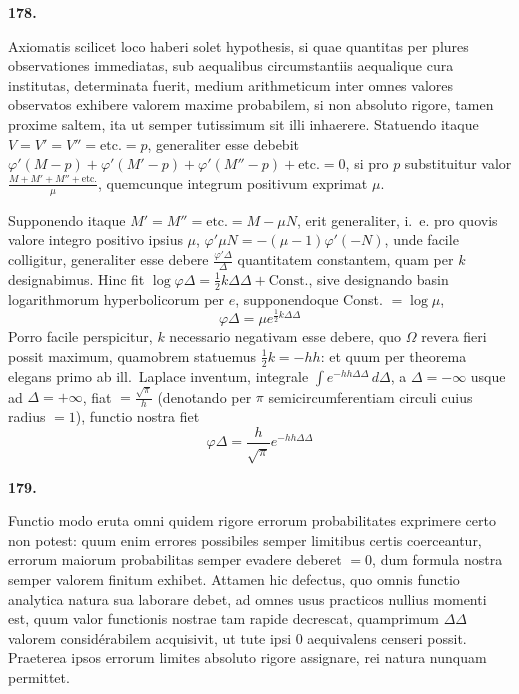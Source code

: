 \documentclass[11pt,a4paper]{article}
\begin{document}
\newpage
\setcounter{page}{252}

\noindent\textbf{178.}

Axiomatis scilicet loco haberi solet hypothesis, si quae quantitas per plures observationes immediatas, sub aequalibus circumstantiis aequalique cura institutas, determinata fuerit, medium arithmeticum inter omnes valores observatos exhibere valorem maxime probabilem, si non absoluto rigore, tamen proxime saltem, ita ut semper tutissimum sit illi inhaerere. Statuendo itaque $V = V' = V'' = \text{etc.} = p$, generaliter esse debebit $\varphi'(M-p) + \varphi'(M'-p) + \varphi'(M''-p) + \text{etc.} = 0$, si pro $p$ substituitur valor $\frac{M + M' + M'' + \text{etc.}}{\mu}$, quemcunque integrum positivum exprimat $\mu$.

Supponendo itaque $M' = M'' = \text{etc.} = M - \mu N$, erit generaliter, i.~e. pro quovis valore integro positivo ipsius $\mu$, $\varphi'\mu N = -(\mu-1)\varphi'(-N)$, unde facile colligitur, generaliter esse debere $\frac{\varphi'\Delta}{\Delta}$ quantitatem constantem, quam per $k$ designabimus. Hinc fit $\log \varphi\Delta = \frac{1}{2}k\Delta\Delta + \text{Const.}$, sive designando basin logarithmorum hyperbolicorum per $e$, supponendoque Const. $= \log\mu$,
\[
\varphi\Delta = \mu e^{\frac{1}{2}k\Delta\Delta}
\]
Porro facile perspicitur, $k$ necessario negativam esse debere, quo $\Omega$ revera fieri possit maximum, quamobrem statuemus $\frac{1}{2}k = -hh$: et quum per theorema elegans primo ab ill.~Laplace inventum, integrale $\int e^{-hh\Delta\Delta} \, d\Delta$, a $\Delta = -\infty$ usque ad $\Delta = +\infty$, fiat $= \frac{\sqrt{\pi}}{h}$ (denotando per $\pi$ semicircumferentiam circuli cuius radius $=1$), functio nostra fiet
\[
\varphi\Delta = \frac{h}{\sqrt{\pi}} e^{-hh\Delta\Delta}
\]

\vspace{1em}

\noindent\textbf{179.}

Functio modo eruta omni quidem rigore errorum probabilitates exprimere certo non potest: quum enim errores possibiles semper limitibus certis coerceantur, errorum maiorum probabilitas semper evadere deberet $= 0$, dum formula nostra semper valorem finitum exhibet. Attamen hic defectus, quo omnis functio analytica natura sua laborare debet, ad omnes usus practicos nullius momenti est, quum valor functionis nostrae tam rapide decrescat, quamprimum $\Delta\Delta$ valorem considérabilem acquisivit, ut tute ipsi $0$ aequivalens censeri possit. Praeterea ipsos errorum limites absoluto rigore assignare, rei natura nunquam permittet.
\end{document}
